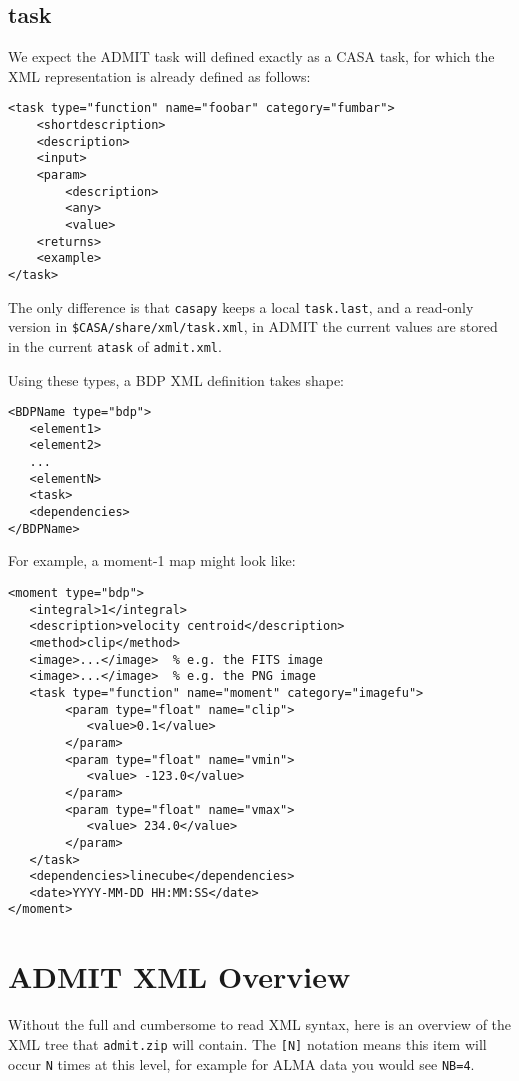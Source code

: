 \documentclass{article}
\begin{document}
\subsection{task}
We expect the ADMIT task will defined exactly as a CASA task, for which the XML
representation is already defined as follows:

\begin{verbatim}
<task type="function" name="foobar" category="fumbar">
    <shortdescription>
    <description>
    <input>
    <param>
        <description>
        <any>
        <value>
    <returns>
    <example>
</task>  

\end{verbatim}

\noindent
The only difference is that {\tt casapy} keeps a local {\tt task.last}, and a 
read-only version in {\tt \$CASA/share/xml/task.xml}, in ADMIT the current values
are stored in the current {\tt atask} of {\tt admit.xml}.


Using these types, a BDP XML definition takes shape:

\begin{verbatim}
<BDPName type="bdp">
   <element1>
   <element2>
   ...
   <elementN>
   <task>
   <dependencies>
</BDPName>

\end{verbatim}

\noindent For example, a moment-1 map might look like:

\begin{verbatim}
<moment type="bdp">
   <integral>1</integral>
   <description>velocity centroid</description>
   <method>clip</method>
   <image>...</image>  % e.g. the FITS image
   <image>...</image>  % e.g. the PNG image
   <task type="function" name="moment" category="imagefu">
        <param type="float" name="clip">
           <value>0.1</value>
        </param>
        <param type="float" name="vmin">
           <value> -123.0</value>
        </param>
        <param type="float" name="vmax">
           <value> 234.0</value>
        </param>
   </task>
   <dependencies>linecube</dependencies>
   <date>YYYY-MM-DD HH:MM:SS</date>
</moment>

\end{verbatim}


\section{ADMIT XML Overview}
Without the full and cumbersome to read XML syntax, here is an overview of
the XML tree that {\tt admit.zip} will contain.  The {\tt [N]} notation
means this item will occur {\tt N} times at this level, for example for
ALMA data you would see {\tt NB=4}.
\end{document}
